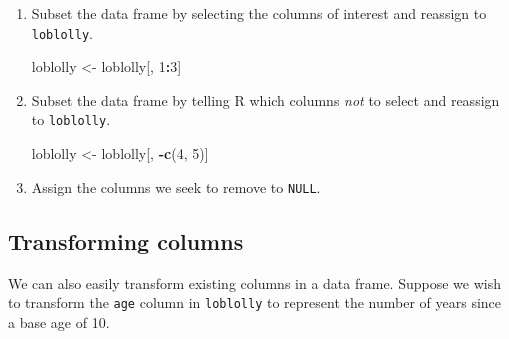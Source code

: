 \documentclass[
  11pt,
]{krantz}
\newenvironment{Shaded}{\begin{snugshade}}{\end{snugshade}}
\newcommand{\CommentTok}[1]{\textcolor[rgb]{0.56,0.35,0.01}{\textit{#1}}}
\newcommand{\DecValTok}[1]{\textcolor[rgb]{0.00,0.00,0.81}{#1}}
\newcommand{\KeywordTok}[1]{\textcolor[rgb]{0.13,0.29,0.53}{\textbf{#1}}}
\newcommand{\NormalTok}[1]{#1}
\newcommand{\OperatorTok}[1]{\textcolor[rgb]{0.81,0.36,0.00}{\textbf{#1}}}
\newcommand{\OtherTok}[1]{\textcolor[rgb]{0.56,0.35,0.01}{#1}}
\newcommand{\StringTok}[1]{\textcolor[rgb]{0.31,0.60,0.02}{#1}}
\theoremstyle{definition}
\theoremstyle{definition}
\theoremstyle{definition}
\theoremstyle{definition}
\theoremstyle{remark}
\begin{document}
\begin{enumerate}
\def\labelenumi{\arabic{enumi}.}
\item
  Subset the data frame by selecting the columns of interest and reassign to \texttt{loblolly}.

\begin{Shaded}
\begin{Highlighting}[]
\NormalTok{loblolly \textless{}{-}}\StringTok{ }\NormalTok{loblolly[, }\DecValTok{1}\OperatorTok{:}\DecValTok{3}\NormalTok{]}
\end{Highlighting}
\end{Shaded}
\item
  Subset the data frame by telling R which columns \emph{not} to select and reassign to \texttt{loblolly}.

\begin{Shaded}
\begin{Highlighting}[]
\NormalTok{loblolly \textless{}{-}}\StringTok{ }\NormalTok{loblolly[, }\OperatorTok{{-}}\KeywordTok{c}\NormalTok{(}\DecValTok{4}\NormalTok{, }\DecValTok{5}\NormalTok{)]}
\end{Highlighting}
\end{Shaded}
\item
  Assign the columns we seek to remove to \texttt{NULL}.

\begin{Shaded}
\end{Shaded}
\end{enumerate}

\hypertarget{transformVariables}{%
\subsection{Transforming columns}\label{transformVariables}}

We can also easily transform existing columns in a data frame. Suppose we wish to transform the \texttt{age} column in \texttt{loblolly} to represent the number of years since a base age of 10.
\end{document}
